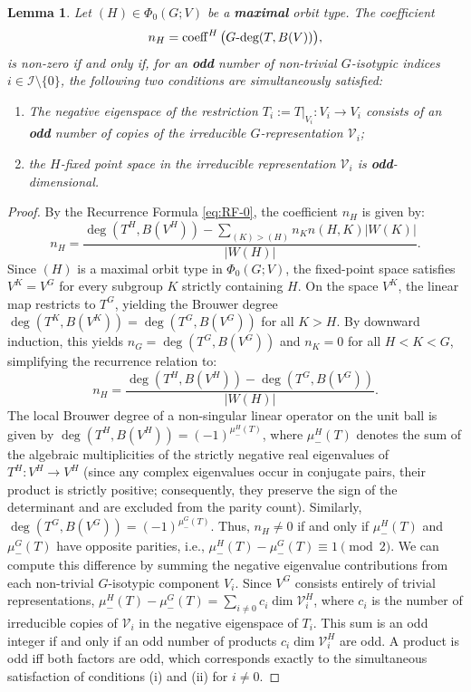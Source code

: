 \documentclass[twoside]{article}%
\def\gdeg{G\text{\rm -deg}}
\newtheorem{lemma}[theorem]{Lemma}
\begin{document}
\begin{lemma}\label{lemm:nontriviality_conditions}
Let $(H) \in \Phi_0(G; V)$ be a \textbf{maximal} orbit type. The coefficient 
\[
n_H = \operatorname{coeff}^H \big(\gdeg(T, B(V))\big),
\]
is non-zero if and only if, for an \textbf{odd} number of non-trivial $G$-isotypic indices $i \in \mathcal{I} \setminus \{0\}$, the following two conditions are simultaneously satisfied:
\begin{enumerate}
    \item[(i)] The negative eigenspace of the restriction $T_i := T|_{V_i}: V_i \to V_i$ consists of an \textbf{odd} number of copies of the irreducible $G$-representation $\mathcal V_i$;
    \item[(ii)] the $H$-fixed point space in the irreducible representation $\mathcal V_i$ is \textbf{odd}-dimensional.
\end{enumerate}
\end{lemma}
\begin{proof}
By the Recurrence Formula \eqref{eq:RF-0}, the coefficient $n_H$ is given by:
\[
n_H = \frac{\deg(T^H, B(V^H)) - \sum_{(K) > (H)} n_K n(H,K) |W(K)|}{|W(H)|}.
\]
Since $(H)$ is a maximal orbit type in $\Phi_0(G; V)$, the fixed-point space satisfies $V^K = V^G$ for every subgroup $K$ strictly containing $H$. On the space $V^K$, the linear map restricts to $T^G$, yielding the Brouwer degree $\deg(T^K, B(V^K)) = \deg(T^G, B(V^G))$ for all $K > H$. By downward induction, this yields $n_G = \deg(T^G, B(V^G))$ and $n_K = 0$ for all $H < K < G$, simplifying the recurrence relation to:
\[
n_H = \frac{\deg(T^H, B(V^H)) - \deg(T^G, B(V^G))}{|W(H)|}.
\]
The local Brouwer degree of a non-singular linear operator on the unit ball is given by $\deg(T^H, B(V^H)) = (-1)^{\mu_-^H(T)}$, where $\mu_-^H(T)$ denotes the sum of the algebraic multiplicities of the strictly negative real eigenvalues of $T^H: V^H \to V^H$ {\red (since any complex eigenvalues occur in conjugate pairs, their product is strictly positive; consequently, they preserve the sign of the determinant and are excluded from the parity count)}. Similarly, $\deg(T^G, B(V^G)) = (-1)^{\mu_-^G(T)}$.
Thus, $n_H \neq 0$ if and only if $\mu_-^H(T)$ and $\mu_-^G(T)$ have opposite parities, i.e., $\mu_-^H(T) - \mu_-^G(T) \equiv 1 \pmod 2$.
We can compute this difference by summing the negative eigenvalue contributions from each non-trivial $G$-isotypic component $V_i$. Since $V^G$ consists entirely of trivial representations, $\mu_-^H(T) - \mu_-^G(T) = \sum_{i \neq 0} c_i \dim \mathcal{V}_i^H$, where $c_i$ is the number of irreducible copies of $\mathcal{V}_i$ in the negative eigenspace of $T_i$.
This sum is an odd integer if and only if an odd number of products $c_i \dim \mathcal{V}_i^H$ are odd.
A product is odd iff both factors are odd, which corresponds exactly to the simultaneous satisfaction of conditions (i) and (ii) for $i \neq 0$.
\end{proof}
\end{document}

